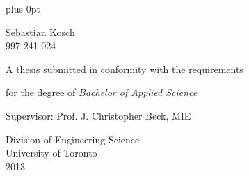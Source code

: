 \fontsize{12pt}{16pt}\selectfont
\thispagestyle{empty}
\pagestyle{fancy}

\baselineskip=16.8pt plus 0pt
\frenchspacing

\begin{centering}
\vspace{3em}
\LARGE{}

\vspace{2em}
\large
\sansfont Sebastian Kosch\\
997 241 024

\vfill
\normalfont
\fontsize{12pt}{16pt}\selectfont
A thesis submitted in conformity with the requirements

for the degree of \textit{Bachelor of Applied Science}

\vspace{1em}
Supervisor: Prof. J. Christopher Beck, MIE

\vspace{2em}

\textmd Division of Engineering Science\\
University of Toronto\\

2013

\end{centering}
\pagebreak
